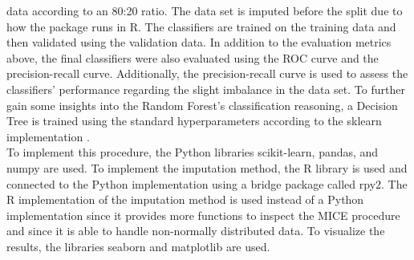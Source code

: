 data according to an 80:20 ratio. The data set is imputed 
before the split 
due to how the  package runs in R. The classifiers are 
trained on the training data and then validated using the validation data. 
In addition to the evaluation metrics above, the final classifiers were also 
evaluated using the ROC curve and the precision-recall curve. Additionally, the 
precision-recall curve is used to assess the classifiers' performance 
regarding the slight imbalance in the data set. To further gain some insights 
into the Random Forest's classification reasoning, a Decision 
Tree is trained using the standard hyperparameters according to the sklearn 
implementation \cite{RN191}.
\\
To implement this procedure, the Python libraries scikit-learn, pandas, and 
numpy are used. To implement the imputation method, the R library  
is used and connected to the Python implementation using a bridge package 
called rpy2. The R implementation of the imputation method is used instead of a 
Python implementation since it provides more functions to inspect the MICE 
procedure and since it is able to handle non-normally distributed data. To 
visualize the results, the libraries seaborn and matplotlib are used.

